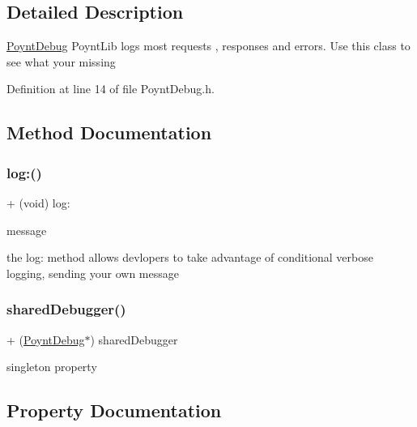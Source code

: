 \subsection{Detailed Description}
\hyperlink{interface_poynt_debug}{Poynt\+Debug}  Poynt\+Lib logs most requests , responses and errors. Use this class to see what your missing 

Definition at line 14 of file Poynt\+Debug.\+h.



\subsection{Method Documentation}
\hypertarget{interface_poynt_debug_a7a02ec4b1915a579185b23cc7d2e6b40}{}\label{interface_poynt_debug_a7a02ec4b1915a579185b23cc7d2e6b40} 
\subsubsection{\texorpdfstring{log\+:()}{log:()}}
{\footnotesize\ttfamily + (void) log\+: \begin{DoxyParamCaption}\item[{(N\+S\+String $\ast$)}]{message }\end{DoxyParamCaption}}



the log\+: method allows devlopers to take advantage of conditional verbose logging, sending your own message 

\hypertarget{interface_poynt_debug_a4dfaa75fbad98c4583833b43e18c0bbb}{}\label{interface_poynt_debug_a4dfaa75fbad98c4583833b43e18c0bbb} 
\subsubsection{\texorpdfstring{shared\+Debugger()}{sharedDebugger()}}
{\footnotesize\ttfamily + (\hyperlink{interface_poynt_debug}{Poynt\+Debug}$\ast$) shared\+Debugger \begin{DoxyParamCaption}{ }\end{DoxyParamCaption}}



singleton property 



\subsection{Property Documentation}
\hypertarget{interface_poynt_debug_ad023bbf13e60f8caee82c26f70e0f0a5}{}\label{interface_poynt_debug_ad023bbf13e60f8caee82c26f70e0f0a5} 
